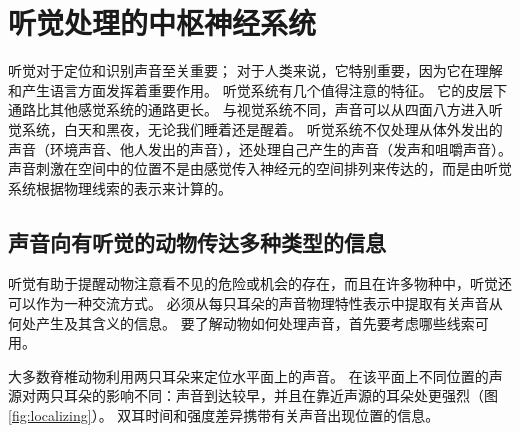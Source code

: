 \chapter{听觉处理的中枢神经系统} \label{chap:chap28}
听觉对于定位和识别声音至关重要； 对于人类来说，它特别重要，因为它在理解和产生语言方面发挥着重要作用。 听觉系统有几个值得注意的特征。 它的皮层下通路比其他感觉系统的通路更长。 与视觉系统不同，声音可以从四面八方进入听觉系统，白天和黑夜，无论我们睡着还是醒着。 听觉系统不仅处理从体外发出的声音（环境声音、他人发出的声音），还处理自己产生的声音（发声和咀嚼声音）。 声音刺激在空间中的位置不是由感觉传入神经元的空间排列来传达的，而是由听觉系统根据物理线索的表示来计算的。

\section{声音向有听觉的动物传达多种类型的信息}
听觉有助于提醒动物注意看不见的危险或机会的存在，而且在许多物种中，听觉还可以作为一种交流方式。 必须从每只耳朵的声音物理特性表示中提取有关声音从何处产生及其含义的信息。 要了解动物如何处理声音，首先要考虑哪些线索可用。

大多数脊椎动物利用两只耳朵来定位水平面上的声音。 在该平面上不同位置的声源对两只耳朵的影响不同：声音到达较早，并且在靠近声源的耳朵处更强烈（图\ref{fig:localizing}）。 双耳时间和强度差异携带有关声音出现位置的信息。

